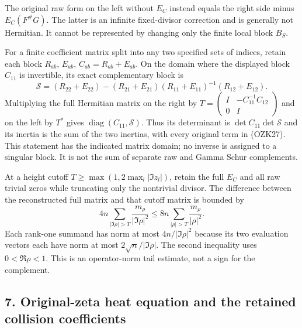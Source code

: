 \documentclass[
  10pt,
  a4paper,
]{article}
\begin{document}
The original raw form on the left without \(E_C\) instead equals the
right side minus \(E_C(F^\#G)\). The latter is an infinite fixed-divisor
correction and is generally not Hermitian. It cannot be represented by
changing only the finite local block \(B_S\).

For a finite coefficient matrix split into any two specified sets of
indices, retain each block \(R_{ab}\), \(E_{ab}\),
\(C_{ab}=R_{ab}+E_{ab}\). On the domain where the displayed block
\(C_{11}\) is invertible, its exact complementary block is \[
\mathcal S=(R_{22}+E_{22})
 -(R_{21}+E_{21})(R_{11}+E_{11})^{-1}(R_{12}+E_{12}).
\tag{OZK27}
\] Multiplying the full Hermitian matrix on the right by
\(T=\left(\begin{smallmatrix}I&-C_{11}^{-1}C_{12}\\0&I\end{smallmatrix}\right)\)
and on the left by \(T^*\) gives
\(\operatorname{diag}(C_{11},\mathcal S)\). Thus its determinant is
\(\det C_{11}\det\mathcal S\) and its inertia is the sum of the two
inertias, with every original term in (OZK27). This statement has the
indicated matrix domain; no inverse is assigned to a singular block. It
is not the sum of separate raw and Gamma Schur complements.

At a height cutoff \(T\ge\max(1,2\max_l|\Im z_l|)\), retain the full
\(E_C\) and all raw trivial zeros while truncating only the nontrivial
divisor. The difference between the reconstructed full matrix and that
cutoff matrix is bounded by \[
4n\sum_{|\Im\rho|>T}\frac{m_\rho}{|\Im\rho|^2}
\le8n\sum_{|\rho|>T}\frac{m_\rho}{|\rho|^2}.
\tag{OZK28}
\] Each rank-one summand has norm at most \(4n/|\Im\rho|^2\) because its
two evaluation vectors each have norm at most \(2\sqrt n/|\Im\rho|\).
The second inequality uses \(0<\Re\rho<1\). This is an operator-norm
tail estimate, not a sign for the complement.

\subsection{7. Original-zeta heat equation and the retained collision
coefficients}\label{original-zeta-heat-equation-and-the-retained-collision-coefficients}
\end{document}
